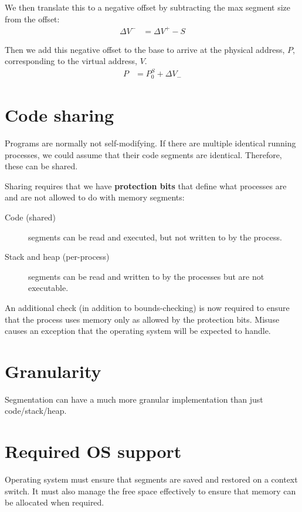 We then translate this to a negative offset by subtracting the max segment size from the offset:
\begin{align}
  \Delta V^- & = \Delta V^+ - S               
\end{align}

Then we add this negative offset to the base to arrive at the physical address, $P$, corresponding to the virtual address, $V$.
\begin{align}
  P & = P_0^S + \Delta V_-
\end{align}

\section{Code sharing}

Programs are normally not self-modifying.
If there are multiple identical running processes, we could assume that their code segments are identical.
Therefore, these can be shared.

Sharing requires that we have \textbf{protection bits} that define what processes are and are not allowed to do with memory segments:
\begin{description}
\item[Code (shared)] segments can be read and executed, but not written to by the process. 
\item[Stack and heap (per-process)] segments can be read and written to by the processes but are not executable.
\end{description}

An additional check (in addition to bounds-checking) is now required to ensure that the process uses memory only as allowed by the protection bits.
Misuse causes an exception that the operating system will be expected to handle.

\section{Granularity}

Segmentation can have a much more granular implementation than just code/stack/heap.

\section{Required OS support}

Operating system must ensure that segments are saved and restored on a context switch.
It must also manage the free space effectively to ensure that memory can be allocated when required.




